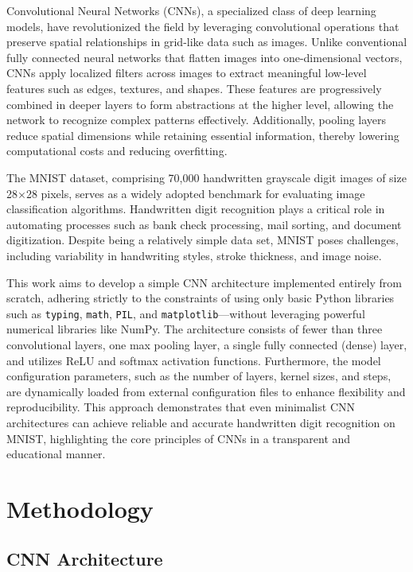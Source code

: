 \documentclass[conference]{IEEEtran}
\begin{document}
Convolutional Neural Networks (CNNs), a specialized class of deep learning models, have revolutionized the field by leveraging convolutional operations that preserve spatial relationships in grid-like data such as images. Unlike conventional fully connected neural networks that flatten images into one-dimensional vectors, CNNs apply localized filters across images to extract meaningful low-level features such as edges, textures, and shapes. These features are progressively combined in deeper layers to form abstractions at the higher level, allowing the network to recognize complex patterns effectively. Additionally, pooling layers reduce spatial dimensions while retaining essential information, thereby lowering computational costs and reducing overfitting.

The MNIST dataset, comprising 70,000 handwritten grayscale digit images of size 28×28 pixels, serves as a widely adopted benchmark for evaluating image classification algorithms. Handwritten digit recognition plays a critical role in automating processes such as bank check processing, mail sorting, and document digitization. Despite being a relatively simple data set, MNIST poses challenges, including variability in handwriting styles, stroke thickness, and image noise.

This work aims to develop a simple CNN architecture implemented entirely from scratch, adhering strictly to the constraints of using only basic Python libraries such as \texttt{typing}, \texttt{math}, \texttt{PIL}, and \texttt{matplotlib}—without leveraging powerful numerical libraries like NumPy. The architecture consists of fewer than three convolutional layers, one max pooling layer, a single fully connected (dense) layer, and utilizes ReLU and softmax activation functions. Furthermore, the model configuration parameters, such as the number of layers, kernel sizes, and steps, are dynamically loaded from external configuration files to enhance flexibility and reproducibility. This approach demonstrates that even minimalist CNN architectures can achieve reliable and accurate handwritten digit recognition on MNIST, highlighting the core principles of CNNs in a transparent and educational manner.

\section{Methodology}
\subsection{CNN Architecture}
\end{document}
